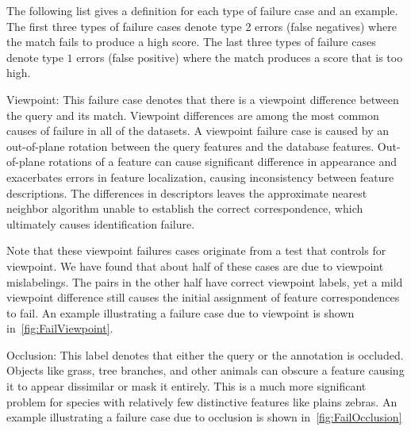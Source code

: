         \TagExpt{}

        The following list gives a definition for each type of failure case and an example.
        The first three types of failure cases denote type 2 errors (false negatives) where the \groundtrue{}
          match fails to produce a high score.
        The last three types of failure cases denote type $1$ errors (false positive) where the \groundfalse{}
          match produces a score that is too high.

        \begin{itemln}

            \item Viewpoint:
            This failure case denotes that there is a viewpoint difference between the query and its
              \groundtrue{} match.
            Viewpoint differences are among the most common causes of failure in all of the datasets.
            A viewpoint failure case is caused by an out-of-plane rotation between the query features and the
              \groundtrue{} database features.
            Out-of-plane rotations of a feature can cause significant difference in appearance and exacerbates
              errors in feature localization, causing inconsistency between feature descriptions.
            The differences in descriptors leaves the approximate nearest neighbor algorithm unable to establish
              the correct correspondence, which ultimately causes identification failure.

            Note that these viewpoint failures cases originate from a test that controls for viewpoint.
            We have found that about half of these cases are due to viewpoint mislabelings.
            The pairs in the other half have correct viewpoint labels, yet a mild viewpoint difference still
              causes the initial assignment of feature correspondences to fail.
            An example illustrating a failure case due to viewpoint is shown in~\cref{fig:FailViewpoint}.

            \FailViewpoint{}

            \item Occlusion:
            This label denotes that either the query or the \groundtrue{} annotation is occluded.
            Objects like grass, tree branches, and other animals can obscure a feature causing it to appear
              dissimilar or mask it entirely.
            This is a much more significant problem for species with relatively few distinctive features like
              plains zebras.
            An example illustrating a failure case due to occlusion is shown in~\cref{fig:FailOcclusion}


\end{itemln}
